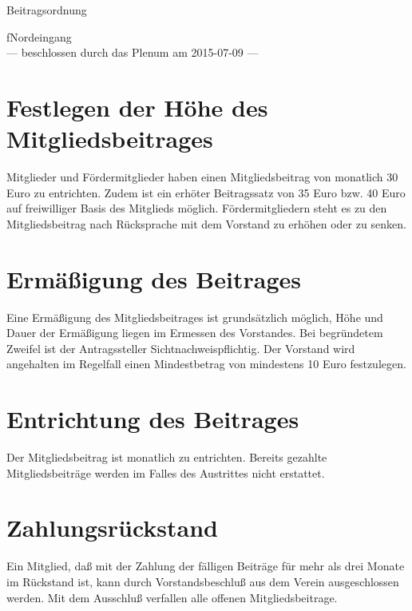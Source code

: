 \documentclass[ngerman]{scrartcl}
\begin{document}
\renewcommand*{\othersectionlevelsformat}[3]{\S#3\autodot\enskip}
\begin{titlepage}
\centerline{\Large Beitragsordnung}
\begin{center}
{\Huge fNordeingang}\\[5mm]
\vfill
--- beschlossen durch das Plenum am 2015-07-09 ---
\end{center}
\end{titlepage}
\section{Festlegen der Höhe des Mitgliedsbeitrages}
Mitglieder und Fördermitglieder haben einen Mitgliedsbeitrag von monatlich
30 Euro zu entrichten. Zudem ist ein erhöter Beitragssatz von 35 Euro bzw. 40 Euro auf freiwilliger Basis des Mitglieds möglich.
Fördermitgliedern steht es zu den Mitgliedsbeitrag nach Rücksprache mit dem Vorstand zu erhöhen oder zu senken.
\section{Ermäßigung des Beitrages}
Eine Ermäßigung des Mitgliedsbeitrages ist grundsätzlich möglich, Höhe und
Dauer der Ermäßigung liegen im Ermessen des Vorstandes. Bei begründetem
Zweifel ist der Antragssteller Sichtnachweispflichtig. Der Vorstand wird angehalten im Regelfall einen Mindestbetrag von mindestens 10 Euro festzulegen.
\section{Entrichtung des Beitrages}
Der Mitgliedsbeitrag ist monatlich zu entrichten.
Bereits gezahlte Mitgliedsbeiträge werden im Falles
des Austrittes nicht erstattet.
\section{Zahlungsrückstand}
Ein Mitglied, daß mit der Zahlung der fälligen Beiträge für mehr als drei
Monate im Rückstand ist, kann durch Vorstandsbeschluß aus dem Verein
ausgeschlossen werden. Mit dem Ausschluß verfallen alle offenen Mitgliedsbeitrage.
\end{document}
